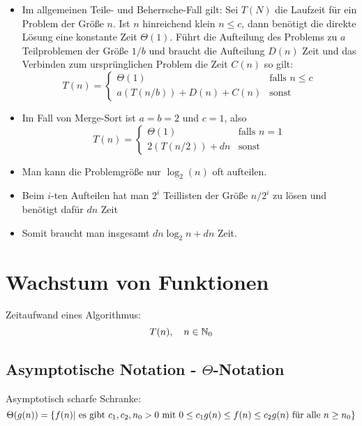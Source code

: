\documentclass[a4paper,twoside,DIV15,BCOR12mm]{scrbook}
\begin{document}
\begin{itemize}
	\item Im allgemeinen Teile- und Beherrsche-Fall gilt: Sei $T(N)$ die Laufzeit für ein Problem der Größe $n$. Ist $n$ hinreichend klein $n \leq c$, dann benötigt die direkte Lösung eine konstante Zeit $\Theta(1)$. Führt die Aufteilung des Problems zu $a$ Teilproblemen der Größe $1/b$ und braucht die Aufteilung $D(n)$ Zeit und das Verbinden zum ursprünglichen Problem die Zeit $C(n)$ so gilt:
	$$T(n)=
	\begin{cases}
		\Theta(1) & \text{falls } n \leq c \\
		a(T(n/b)) + D(n) + C(n) & \text{sonst }
	\end{cases}$$
	\item Im Fall von Merge-Sort ist $a=b=2$ und $c=1$, also	
	$$T(n)=
	\begin{cases}
	\Theta(1) & \text{falls } n=1 \\
	2(T(n/2)) + dn & \text{sonst }
	\end{cases}$$
\end{itemize}


\begin{itemize}
	\item Man kann die Problemgröße nur $\log_2(n)$ oft aufteilen.
	\item Beim $i$-ten Aufteilen hat man $2^i$ Teillisten der Größe $n/2^i$ zu lösen und benötigt dafür $dn$ Zeit
	\item Somit braucht man insgesamt $dn\log_2n+dn$ Zeit.
\end{itemize}

\section{Wachstum von Funktionen}

Zeitaufwand eines Algorithmus:
$$T(n),\quad n\in\mathbb{N}_0$$


\subsection{Asymptotische Notation - $\Theta$-Notation}

Asymptotisch scharfe Schranke: 
$$ \Theta(g(n))=\{f(n)| \textnormal{ es gibt } c_1,c_2,n_0>0 \textnormal{ mit } 0\leq c_1 g(n) \leq f(n) \leq c_2 g(n) \textnormal{ für alle } n \geq n_0\} $$ 
\end{document}
